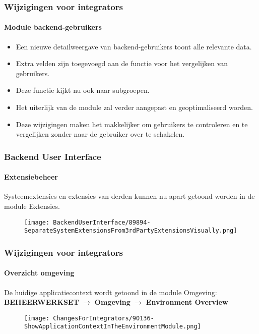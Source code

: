 
\begin{frame}[fragile]
	\frametitle{Wijzigingen voor integrators}
	\framesubtitle{Module backend-gebruikers}

	\begin{itemize}
		\item Een nieuwe detailweergave van backend-gebruikers toont alle relevante data.
		\item Extra velden zijn toegevoegd aan de functie voor het vergelijken van gebruikers.
		\item Deze functie kijkt nu ook naar subgroepen.
		\item Het uiterlijk van de module zal verder aangepast en geoptimaliseerd worden.
		\item Deze wijzigingen maken het makkelijker om gebruikers te controleren en te
			vergelijken zonder naar de gebruiker over te schakelen.
	\end{itemize}

\end{frame}


\begin{frame}[fragile]
	\frametitle{Backend User Interface}
	\framesubtitle{Extensiebeheer}

	Systeemextensies en extensies van derden kunnen nu apart getoond worden in de module Extensies.

	\begin{figure}
		\texttt{[image: BackendUserInterface/89894-SeparateSystemExtensionsFrom3rdPartyExtensionsVisually.png]}
	\end{figure}

\end{frame}


\begin{frame}[fragile]
	\frametitle{Wijzigingen voor integrators}
	\framesubtitle{Overzicht omgeving}

	De huidige applicatiecontext wordt getoond in de module Omgeving:\newline
	\textbf{BEHEERWERKSET} $\rightarrow$ \textbf{Omgeving} $\rightarrow$ \textbf{Environment Overview}

	\begin{figure}
		\texttt{[image: ChangesForIntegrators/90136-ShowApplicationContextInTheEnvironmentModule.png]}
	\end{figure}

\end{frame}

